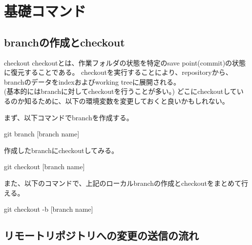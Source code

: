\documentclass[10pt,a4j,openany,dvipdfmx]{jsarticle}
\begin{document}
\section{基礎コマンド} %
\label{sec:基礎コマンド}


\subsection{branchの作成とcheckout} %
\label{sub:branchの作成とcheckout}

\begin{redbox}{checkout}
checkoutとは、作業フォルダの状態を特定のsave point(commit)の状態に復元することである。
checkoutを実行することにより、repositoryから、branchのデータをindexおよびworking treeに展開される。\\
(基本的にはbranchに対してcheckoutを行うことが多い。)
\tcblower
どこにcheckoutしているのか知るために、以下の環境変数を変更しておくと良いかもしれない。
\end{redbox}

まず、以下コマンドでbranchを作成する。
\begin{commandshell}
git branch [branch name]
\end{commandshell}

作成したbranchにcheckoutしてみる。
\begin{commandshell}
git checkout [branch name]
\end{commandshell}


また、以下のコマンドで、上記のローカルbranchの作成とcheckoutをまとめて行える。
\begin{commandshell}
git checkout -b [branch name]
\end{commandshell}

\subsection{リモートリポジトリへの変更の送信の流れ} %
\label{sub:リモートリポジトリへの変更の送信の流れ}
\end{document}
